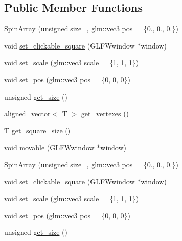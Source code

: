 \subsection*{Public Member Functions}
\begin{DoxyCompactItemize}
\item 
\mbox{\hyperlink{classSpinArray_ab18db2915e18885e5146eef092f4eb67}{Spin\+Array}} (unsigned size\+\_, glm\+::vec3 pos\+\_\+=\{0., 0., 0.\})
\item 
void \mbox{\hyperlink{classSpinArray_af60baac7f6d47c183ce395e909e8513f}{set\+\_\+clickable\+\_\+square}} (G\+L\+F\+Wwindow $\ast$window)
\item 
void \mbox{\hyperlink{classSpinArray_acc4dd3d5a680c195ebaea00120bd5ed8}{set\+\_\+scale}} (glm\+::vec3 scale\+\_\+=\{1, 1, 1\})
\item 
void \mbox{\hyperlink{classSpinArray_a904e68a8b76d7da16140a0352ae04dfa}{set\+\_\+pos}} (glm\+::vec3 pos\+\_\+=\{0, 0, 0\})
\item 
unsigned \mbox{\hyperlink{classSpinArray_ae7aa5d361c1f3024506291b04e027a7a}{get\+\_\+size}} ()
\item 
\mbox{\hyperlink{type__definitions_8hpp_a087efd587d66b881646ef378f1919c90}{aligned\+\_\+vector}}$<$ T $>$ \mbox{\hyperlink{classSpinArray_ac4a17ebe80ae433662d69537adf9a4de}{get\+\_\+vertexes}} ()
\item 
T \mbox{\hyperlink{classSpinArray_adf314e4c6182e5344e8b793784576677}{get\+\_\+square\+\_\+size}} ()
\item 
void \mbox{\hyperlink{classSpinArray_ab2d41adf8269369e26c316684da70462}{movable}} (G\+L\+F\+Wwindow $\ast$window)
\item 
\mbox{\hyperlink{classSpinArray_ab18db2915e18885e5146eef092f4eb67}{Spin\+Array}} (unsigned size\+\_, glm\+::vec3 pos\+\_\+=\{0., 0., 0.\})
\item 
void \mbox{\hyperlink{classSpinArray_af60baac7f6d47c183ce395e909e8513f}{set\+\_\+clickable\+\_\+square}} (G\+L\+F\+Wwindow $\ast$window)
\item 
void \mbox{\hyperlink{classSpinArray_acc4dd3d5a680c195ebaea00120bd5ed8}{set\+\_\+scale}} (glm\+::vec3 scale\+\_\+=\{1, 1, 1\})
\item 
void \mbox{\hyperlink{classSpinArray_a904e68a8b76d7da16140a0352ae04dfa}{set\+\_\+pos}} (glm\+::vec3 pos\+\_\+=\{0, 0, 0\})
\item 
unsigned \mbox{\hyperlink{classSpinArray_ae7aa5d361c1f3024506291b04e027a7a}{get\+\_\+size}} ()
\item 

\end{DoxyCompactItemize}

